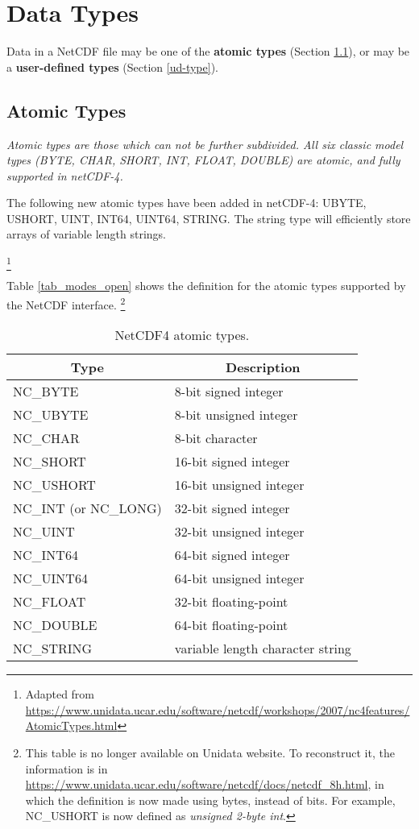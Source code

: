 \section{Data Types}

Data in a NetCDF file may be one of the \textbf{atomic types} (Section \ref{ed-type}), or may be a \textbf{user-defined types} (Section \ref{ud-type}).

\subsection{Atomic Types}
\label{ed-type}

{\itshape
Atomic types are those which can not be further subdivided.
All six classic model types (BYTE, CHAR, SHORT, INT, FLOAT, DOUBLE) are atomic, and fully supported in netCDF-4.

The following new atomic types have been added in netCDF-4: UBYTE, USHORT, UINT, INT64, UINT64, STRING. The string type will efficiently store arrays of variable length strings.
}\footnote{Adapted from \url{https://www.unidata.ucar.edu/software/netcdf/workshops/2007/nc4features/AtomicTypes.html}}

Table \ref{tab_modes_open} shows the definition for the atomic types supported by the NetCDF interface.
\footnote{This table is no longer available on Unidata website. To reconstruct it, the information is in \url{https://www.unidata.ucar.edu/software/netcdf/docs/netcdf_8h.html}, in which the definition is now made using bytes, instead of bits. For example, NC\_USHORT is now defined as \textit{unsigned 2-byte int}.}

\begin{table}[H]
\centering
\begin{tabular}{|l|l|}
\hline
\multicolumn{1}{|c|}{Type} & \multicolumn{1}{c|}{Description} \\ \hline \hline
NC\_BYTE & 8-bit signed integer \\ \hline
NC\_UBYTE & 8-bit unsigned integer \\ \hline
NC\_CHAR & 8-bit character \\ \hline
NC\_SHORT & 16-bit signed integer \\ \hline
NC\_USHORT & 16-bit unsigned integer \\ \hline
NC\_INT (or NC\_LONG) & 32-bit signed integer \\ \hline
NC\_UINT & 32-bit unsigned integer \\ \hline
NC\_INT64 & 64-bit signed integer \\ \hline
NC\_UINT64 & 64-bit unsigned integer \\ \hline
NC\_FLOAT & 32-bit floating-point \\ \hline
NC\_DOUBLE & 64-bit floating-point \\ \hline
NC\_STRING & variable length character string \\ \hline
\hline
\end{tabular}
\caption{NetCDF4 atomic types.}
\end{table}

